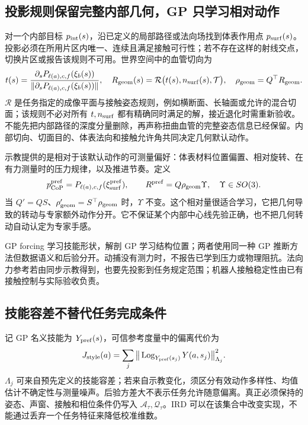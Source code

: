 \documentclass[11pt,a4paper]{article}
\numberwithin{equation}{section}
\theoremstyle{definition}
\begin{document}
\subsection{投影规则保留完整内部几何，GP 只学习相对动作}
对一个内部目标 $p_{\rm int}(s)$，沿已定义的局部路径或法向场找到体表作用点 $p_{\rm surf}(s)$。投影必须在所用片区内唯一、连续且满足接触可行性；若不存在这样的射线交点，切换片区或报告该规则不可用。世界空间中的血管切向为
\begin{equation}
 t(s)=\frac{\partial_s P_{\ell(a),c,f}(\xi_b(s))}
 {\|\partial_s P_{\ell(a),c,f}(\xi_b(s))\|},
 \quad R_{\rm geom}(s)=\mathcal R\bigl(t(s),n_{\rm surf}(s),\mathcal T\bigr),
 \quad \rho_{\rm geom}=Q^\top R_{\rm geom}.
\end{equation}
$\mathcal R$ 是任务指定的成像平面与接触姿态规则，例如横断面、长轴面或允许的混合切面；该规则不必对所有 $t,n_{\rm surf}$ 都有精确同时满足的解，接近退化时需重新验收。不能先把内部路径的深度分量删除，再声称扭曲血管的完整姿态信息已经保留。内部切向、切面目的、体表法向和接触允许角共同决定几何默认动作。

示教提供的是相对于该默认动作的可测量偏好：体表材料位置偏置、相对旋转、在有力测量时的压力规律，以及推进节奏。定义
\begin{equation}
 p_{\rm CoP}^{\rm pref}=P_{\ell(a),c,f}(\xi_{\rm surf}^{\rm pref}),\qquad
 R^{\rm pref}=Q\rho_{\rm geom}\Upsilon,\quad\Upsilon\in SO(3).
\end{equation}
当 $Q'=QS$、$\rho_{\rm geom}'=S^\top\rho_{\rm geom}$ 时，$\Upsilon$ 不变。这个相对量很适合学习，它把几何导致的转动与专家额外动作分开。它不保证某个内部中心线先验正确，也不把几何转动自动认定为专家手感。

GP forcing 学习技能形状，解剖 GP 学习结构位置；两者使用同一种 GP 推断方法但数据语义和后验分开。动捕没有测力时，不报告已学到压力或物理阻抗。法向力参考若由同步示教得到，也要先投影到任务规定范围；机器人接触稳定性由已有接触控制与实际验收负责。

\subsection{技能容差不替代任务完成条件}
记 GP 名义技能为 $Y_{\rm pref}(s)$，可信参考度量中的偏离代价为
\begin{equation}
 J_{\rm style}(a)=\sum_j
 \big\|\operatorname{Log}_{Y_{\rm pref}(s_j)}Y(a,s_j)\big\|^2_{\Lambda_j}.
\end{equation}
$\Lambda_j$ 可来自预先定义的技能容差；若来自示教变化，须区分有效动作多样性、均值估计不确定性与测量噪声。后验方差大不表示任务允许随意偏离。真正必须保持的姿态、声窗、接触和相位条件仍写入 $\mathcal A_\tau,\mathcal Q_\tau$。IRD 可以在该集合中改变实现，不能通过丢弃一个任务特征来降低校准维数。
\end{document}
